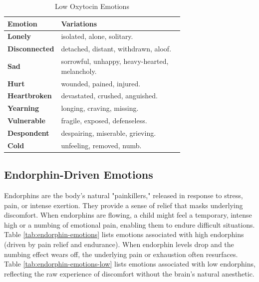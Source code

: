 \begin{table}[H]
\centering
\caption{Low Oxytocin Emotions}
\begin{tabular}{@{}l p{0.7\linewidth}@{}}
\hline
\textbf{Emotion} & \textbf{Variations} \\
\hline
\textbf{Lonely} & isolated, alone, solitary. \\
\textbf{Disconnected} & detached, distant, withdrawn, aloof. \\
\textbf{Sad} & sorrowful, unhappy, heavy-hearted, melancholy. \\
\textbf{Hurt} & wounded, pained, injured. \\
\textbf{Heartbroken} & devastated, crushed, anguished. \\
\textbf{Yearning} & longing, craving, missing. \\
\textbf{Vulnerable} & fragile, exposed, defenseless. \\
\textbf{Despondent} & despairing, miserable, grieving. \\
\textbf{Cold} & unfeeling, removed, numb. \\
\hline
\end{tabular}
\label{tab:oxytocin-emotions-low}
\end{table}

\subsection{Endorphin-Driven Emotions}

Endorphins are the body's natural "painkillers," released in response to stress, pain, or intense exertion. 
They provide a sense of relief that masks underlying discomfort. 
When endorphins are flowing, a child might feel a temporary, intense high or a numbing of emotional pain, enabling them to endure difficult situations. 
Table \ref{tab:endorphin-emotions} lists emotions associated with high endorphins (driven by pain relief and endurance). 
When endorphin levels drop and the numbing effect wears off, the underlying pain or exhaustion often resurfaces. 
Table \ref{tab:endorphin-emotions-low} lists emotions associated with low endorphins, reflecting the raw experience of discomfort without the brain's natural anesthetic.

